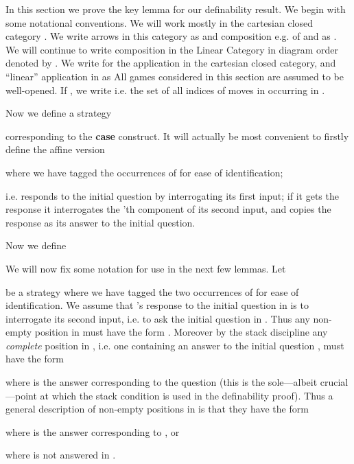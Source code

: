 \documentclass[11pt]{article}
\begin{document}
In this section we prove the key lemma for our definability
result. We begin with some notational conventions. We will work
mostly in the cartesian closed category  . We write
arrows in this category as  and
composition e.g. of  and  as . We will continue to write
composition in the Linear Category  in diagram order
denoted by  . We write  for the application in the cartesian closed
category, and ``linear'' application in  as  All games considered in
this section are assumed to be well-opened. If , we write  i.e. the set of all
indices of moves in  occurring in .

Now we define a strategy

corresponding to the {\bf case} construct. It will actually be most
convenient to firstly define the affine version

where we have tagged the occurrences of  for ease of
identification;

i.e.  responds to the initial question by interrogating its
first input; if it gets the response  it interrogates the 'th
component of its second input, and copies the response as its answer
to the initial question.

Now we define


We will now fix some notation for use in the next few lemmas. Let

be a strategy where we have tagged the two occurrences of  for
ease of identification. We assume that 's response to the
initial question  in  is to interrogate its second input,
i.e. to ask the initial question  in . Thus any non-empty
position in  must have the form . Moreover by the
stack discipline any {\em complete} position in , i.e. one
containing an answer to the initial question , must have the form

where  is the answer corresponding to the question  (this is
the sole---albeit crucial---point at which the stack condition is used
in the definability proof). Thus a general description of non-empty
positions in  is that they have the form

where  is the answer corresponding to , or

where  is not answered in .
\end{document}
